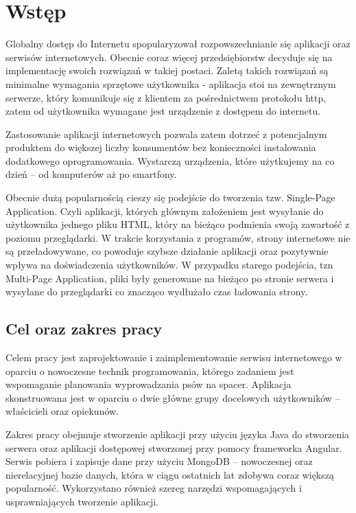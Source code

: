 \chapter{Wstęp}
Globalny dostęp do Internetu spopularyzował rozpowszechnianie się aplikacji oraz serwisów internetowych. Obecnie coraz więcej przedsiębiorstw decyduje się na implementację swoich rozwiązań w takiej postaci. Zaletą takich rozwiązań są minimalne wymagania sprzętowe użytkownika - aplikacja stoi na zewnętrznym serwerze, który komunikuje się z klientem za pośrednictwem protokołu http, zatem od użytkownika wymagane jest urządzenie z dostępem do internetu.

Zastosowanie aplikacji internetowych pozwala zatem dotrzeć z potencjalnym produktem do większej liczby konsumentów bez konieczności instalowania dodatkowego oprogramowania. Wystarczą urządzenia, które użytkujemy na co dzień -- od komputerów aż po smartfony.

Obecnie dużą popularnością cieszy się podejście do tworzenia tzw. Single-Page Application. Czyli aplikacji, których głównym założeniem jest wysyłanie do użytkownika jednego pliku HTML, który na bieżąco podmienia swoją zawartość z poziomu przeglądarki. W trakcie korzystania z programów, strony internetowe nie są przeładowywane, co powoduje szybsze działanie aplikacji oraz pozytywnie wpływa na doświadczenia użytkowników. W przypadku starego podejścia, tzn Multi-Page Application, pliki były generowane na bieżąco po stronie serwera i wysyłane do przeglądarki co znacząco wydłużało czas ładowania strony.
\section{Cel oraz zakres pracy}
Celem pracy jest zaprojektowanie i zaimplementowanie serwisu internetowego w oparciu o  nowoczesne technik programowania, którego zadaniem jest wspomaganie planowania wyprowadzania psów na spacer. Aplikacja skonstruowana jest w oparciu o dwie główne grupy docelowych użytkowników -- właścicieli oraz opiekunów. 

Zakres pracy obejmuje stworzenie aplikacji przy użyciu języka Java do stworzenia serwera oraz aplikacji dostępowej stworzonej przy pomocy frameworka Angular. Serwis pobiera i zapisuje dane przy użyciu MongoDB -- nowoczesnej oraz nierelacyjnej bazie danych, która w ciągu ostatnich lat zdobywa coraz większą popularność. Wykorzystano również szereg narzędzi wspomagających i usprawniających tworzenie aplikacji.

\newpage
